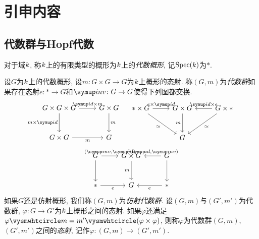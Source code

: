 \section{引申内容}

\subsection{代数群与Hopf代数}\label{sec:algebraicgrouphopfalgebra}

对于域$k$, 称$k$上的有限类型的概形为$k$上的\emph{代数概形}, 记$\operatorname{Spec} (k)$为$*$.

\begin{definition}
  设$G$为$k$上的代数概形, 设$m\colon G\times G\to G$为$k$上概形的态射. 称$(G, m)$为\emph{代数群}如果存在态射$e\colon *\to G$和$\inv\colon G\to G$使得下列图都交换.
  \begin{equation*}
    \begin{tikzcd}[row sep=large]
      G\times G\times G & G\times G\\
      G\times G & G
      \arrow[from=1-1,]{1-2}{\id\times m}
      \arrow[from=1-1,]{2-1}[swap]{m\times \id}
      \arrow[from=1-2,]{2-2}{m}
      \arrow[from=2-1,]{2-2}[swap]{m}
    \end{tikzcd}
    \quad
    \begin{tikzcd}[row sep=large]
      *\times G & G\times G & G\times *\\
      & G &
      \arrow[from=1-1,]{1-2}{e\times \id}
      \arrow[from=1-3,]{1-2}[swap]{\id\times e}
      \arrow[from=1-1,]{2-2}[swap]{\simeq}
      \arrow[from=1-3,]{2-2}{\simeq}
      \arrow[from=1-2,]{2-2}[swap]{m}
    \end{tikzcd}
  \end{equation*}
  \begin{equation*}
    \begin{tikzcd}[row sep=large]
      G & G\times G & G\\
      * & G & *
      \arrow[from=1-1,]{1-2}{(\inv, \id)}
      \arrow[from=1-2,leftarrow]{1-3}{(\id, \inv)}
      \arrow[from=2-1,]{2-2}[swap]{e}
      \arrow[from=2-2,leftarrow]{2-3}[swap]{e}
      \arrow[from=1-1,]{2-1}[swap]{}
      \arrow[from=1-2,]{2-2}[swap]{m}
      \arrow[from=1-3,]{2-3}{}
    \end{tikzcd}
  \end{equation*}
  如果$G$还是仿射概形, 我们称$(G, m)$为\emph{仿射代数群}. 设$(G, m)$与$(G', m')$为代数群, $\varphi\colon G\to G'$为$k$上概形之间的态射. 如果$\varphi$还满足$\varphi\composite m=m'\composite (\varphi\times \varphi)$, 则称$\varphi$为代数群$(G, m)$, $(G', m')$之间的\emph{态射}, 记作$\varphi\colon (G, m)\to (G', m')$.
\end{definition}

